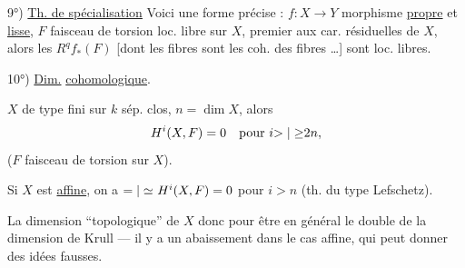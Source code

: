 9°) \uline{Th. de spécialisation} Voici  une forme précise : $f:X\longrightarrow Y$ morphisme \uline{propre} et \uline{lisse}, $F$ faisceau de torsion loc. libre sur $X$, premier aux car. résiduelles de $X$, alors les $R^q f_*(F)$ [dont les fibres sont les coh. des fibres \ldots] sont loc. libres.

10°) \uline{Dim.} \uline{cohomologique}.

$X$ de type fini sur $k$ sép. clos, $n=\dim X$, alors
\[
H^i(X,F)=0\quad\text{pour }i{>|\geq}2n,
\]
($F$ faisceau de torsion sur $X$).

Si $X$ est \uline{affine}, on a $\unsure{=|\simeq}\ H^i(X,F)=0$ pour $i>n$ (th. du type Lefschetz).

La dimension ``topologique'' de $X$  donc pour être en général le double de la dimension de Krull --- il y a un abaissement dans le cas affine, qui peut donner des idées fausses.
